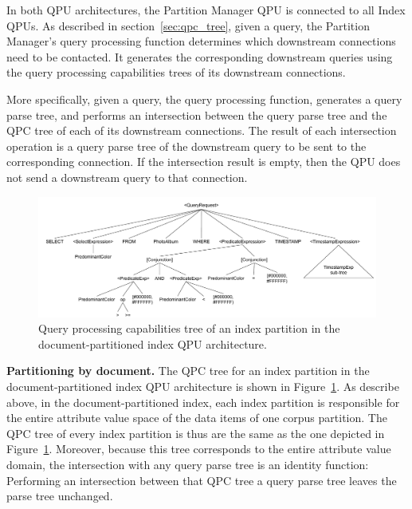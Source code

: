 In both QPU architectures, the Partition Manager QPU is connected to all Index QPUs.
As described in section~\ref{sec:qpc_tree}, given a query,
the Partition Manager's query processing function determines which downstream connections need to be contacted.
It generates the corresponding downstream queries using the query processing capabilities trees of its downstream connections.

More specifically, given a query,
the query processing function, generates a query parse tree,
and performs an intersection between the query parse tree and the QPC tree of each of its downstream connections.
The result of each intersection operation is a query parse tree of the downstream query to be sent to the corresponding
connection.
If the intersection result is empty, then the QPU does not send a downstream query to that connection.

\begin{figure}
  \centering
    \includegraphics[width=\textwidth]{./figures/case_studies/qpt_index_partitioning_docs.pdf}
  \caption{Query processing capabilities tree of an index partition in the document-partitioned index QPU architecture.}
  \label{fig:qpt_index_partitioning_docs}
\end{figure}

\medskip
\noindent
\textbf{Partitioning by document.}
The QPC tree for an index partition in the document-partitioned index QPU architecture is shown in Figure~\ref{fig:qpt_index_partitioning_docs}.
As describe above, in the document-partitioned index, each index partition is responsible for the entire attribute value space of
the data items of one corpus partition.
The QPC tree of every index partition is thus are the same as the one depicted in Figure~\ref{fig:qpt_index_partitioning_docs}.
Moreover, because this tree corresponds to the entire attribute value domain,
the intersection with any query parse tree is an identity function:
Performing an intersection between that QPC tree a query parse tree leaves the parse tree unchanged.

